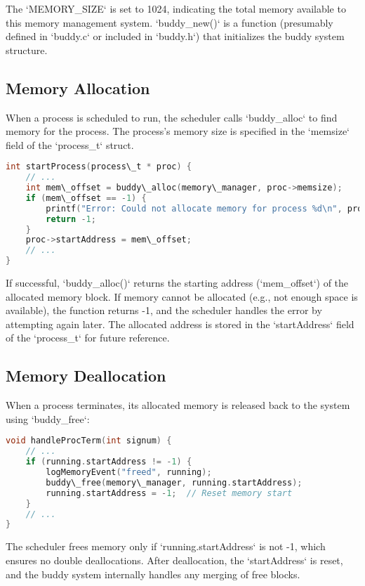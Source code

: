 \documentclass{article}
\begin{document}
The `MEMORY\_SIZE` is set to 1024, indicating the total memory available to this memory management system. `buddy\_new()` is a function (presumably defined in `buddy.c` or included in `buddy.h`) that initializes the buddy system structure.

\subsection{Memory Allocation}
When a process is scheduled to run, the scheduler calls `buddy\_alloc` to find memory for the process. The process's memory size is specified in the `memsize` field of the `process\_t` struct.

\begin{lstlisting}[language=C, caption=Memory Allocation using buddy\_alloc in scheduler.c]
int startProcess(process\_t * proc) {
    // ...
    int mem\_offset = buddy\_alloc(memory\_manager, proc->memsize);
    if (mem\_offset == -1) {
        printf("Error: Could not allocate memory for process %d\n", proc->id);
        return -1;
    }
    proc->startAddress = mem\_offset;
    // ...
}
\end{lstlisting}
If successful, `buddy\_alloc()` returns the starting address (`mem\_offset`) of the allocated memory block. If memory cannot be allocated (e.g., not enough space is available), the function returns -1, and the scheduler handles the error by attempting again later. The allocated address is stored in the `startAddress` field of the `process\_t` for future reference.

\subsection{Memory Deallocation}

When a process terminates, its allocated memory is released back to the system using `buddy\_free`:
\begin{lstlisting}[language=C, caption=Memory Deallocation using buddy\_free in scheduler.c]
void handleProcTerm(int signum) {
    // ...
    if (running.startAddress != -1) {
        logMemoryEvent("freed", running);
        buddy\_free(memory\_manager, running.startAddress);
        running.startAddress = -1;  // Reset memory start
    }
    // ...
}
\end{lstlisting}
The scheduler frees memory only if `running.startAddress` is not -1, which ensures no double deallocations.  After deallocation, the `startAddress` is reset, and the buddy system internally handles any merging of free blocks.
\end{document}
